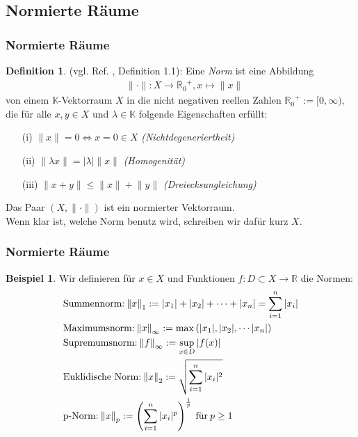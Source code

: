 \documentclass[t, handout]{beamer}
\newcommand{\R}{\mathbb{R}}
\newcommand{\K}{\mathbb{K}}
\newcommand{\RM}[1]{\MakeUppercase{\romannumeral #1{.}}} %
\theoremstyle{definition} %
\newtheorem{dfi}[sa]{Definition} %
\newtheorem*{bsp}{Beispiel}
\begin{document}
\subsection{Normierte Räume}

\begin{frame}
\frametitle{Normierte Räume}
\begin{dfi}
(vgl. Ref. \cite{Werner}, Definition \RM{1}1.1):
Eine \textit{Norm} ist eine Abbildung 
\begin{align*}
 & {\|\cdot\|} : X \rightarrow {\R_0}^+, x \mapsto \|x\|
\end{align*}
von einem $\K$-Vektorraum $X$ in die nicht negativen reellen Zahlen ${\R_0}^+ := [0, \infty)$, die für alle $x, y \in X$ und $\lambda \in \K$ folgende Eigenschaften erfüllt:
\begin{itemize}
\item[(i)] ${\|x\|} = 0 \Leftrightarrow x = 0 \in X$ \textit{(Nichtdegeneriertheit)}
\item[(ii)] ${\|\lambda x\|} = |\lambda|{\|x\|}$ \textit{(Homogenität)}
\item[(iii)] ${\|x + y\|} \leq {\|x\|} + {\|y\|}$ \textit{(Dreiecksungleichung)}
\end{itemize}
\end{dfi}
\pause
Das Paar $(X , {\|\cdot\|})$ ist ein normierter Vektorraum. \\Wenn klar ist, welche Norm benutz wird, schreiben wir dafür kurz $X$.
\end{frame}

\begin{frame}
\frametitle{Normierte Räume}
\begin{bsp}
Wir definieren für $x \in X$ und Funktionen $f : D \subset X \rightarrow \R$ die Normen:
\begin{align*}
& \text{Summennorm:} \: {\|x\|}_1 := |x_1| + |x_2| + \cdots + |x_n| = \sum_{i=1}^n{|x_i|}\\
& \text{Maximumsnorm:} \: {\|x\|}_\infty := \max{(|x_1|, |x_2|, \cdots |x_n|)}\\
& \text{Supremumsnorm:} \: {\|f\|}_\infty := \sup_{x \in D}{|f(x)|}\\
& \text{Euklidische Norm:} \: {\|x\|}_2 := \sqrt{\sum_{i=1}^n{|x_i|^2}}\\
& \text{p-Norm:} \: {\|x\|}_p := \left(\sum_{i=1}^n{|x_i|^p}\right)^{1 \over p} \: \text{für} \: p \geq 1
\end{align*}
\end{bsp}
\end{frame}
\end{document}
